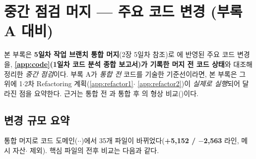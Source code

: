 \chapter{중간 점검 머지 --- 주요 코드 변경 (부록 A 대비)}
\label{app:merge}

본 부록은 \textbf{5일차 작업 브랜치 통합 머지}(2장 5일차 참조)로 에 반영된
주요 코드 변경을, \textbf{\ref{app:code}(1일차 코드 분석 종합 보고서)가 기록한 머지 전
코드 상태}와 대조해 정리한 \emph{중간 점검}이다. 부록 A가 \emph{통합 전} 코드를 기술한
기준선이라면, 본 부록은 그 위에 1$\cdot$2차 Refactoring 계획(\ref{app:refactor1}$\cdot$%
\ref{app:refactor2})이 \emph{실제로 실행}되어 달라진 점을 요약한다. 근거는 통합 전
과 통합 후 의 형상 비교()이다.

\section{변경 규모 요약}
통합 머지로 코드 도메인($\cdot$$\cdot$)에서 35개 파일이
바뀌었다(\textbf{+5,152 / $-$2,563} 라인, 메시 자산$\cdot$ 제외).
핵심 파일의 전후 비교는 다음과 같다.

